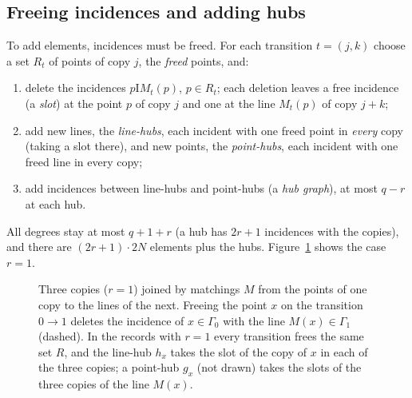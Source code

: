 \documentclass[11pt]{amsart}
\theoremstyle{definition}
\theoremstyle{remark}
\newcommand{\I}{\mathrel{\mathrm{I}}}
\begin{document}
\subsection{Freeing incidences and adding hubs}\label{ssec:hubs}
To add elements, incidences must be freed. For each transition $t=(j,k)$ choose a set $R_t$ of points of copy $j$, the \emph{freed} points, and:
\begin{enumerate}[label=\textup{(\arabic*)},leftmargin=2.5em]
\item delete the incidences $p\I M_t(p)$, $p\in R_t$; each deletion leaves a free incidence (a \emph{slot}) at the point $p$ of copy $j$ and one at the line $M_t(p)$ of copy $j+k$;
\item add new lines, the \emph{line-hubs}, each incident with one freed point in \emph{every} copy (taking a slot there), and new points, the \emph{point-hubs}, each incident with one freed line in every copy;
\item add incidences between line-hubs and point-hubs (a \emph{hub graph}), at most $q-r$ at each hub.
\end{enumerate}
All degrees stay at most $q+1+r$ (a hub has $2r+1$ incidences with the copies), and there are $(2r+1)\cdot2N$ elements plus the hubs. Figure~\ref{fig:hubs} shows the case $r=1$.

\begin{figure}[ht]
\centering
{}
\caption{Three copies ($r=1$) joined by matchings $M$ from the points of one copy to the lines of the next. Freeing the point $x$ on the transition $0\to1$ deletes the incidence of $x\in\Gamma_0$ with the line $M(x)\in\Gamma_1$ (dashed). In the records with $r=1$ every transition frees the same set $R$, and the line-hub $h_x$ takes the slot of the copy of $x$ in each of the three copies; a point-hub $g_x$ (not drawn) takes the slots of the three copies of the line $M(x)$.}
\label{fig:hubs}
\end{figure}
\end{document}
